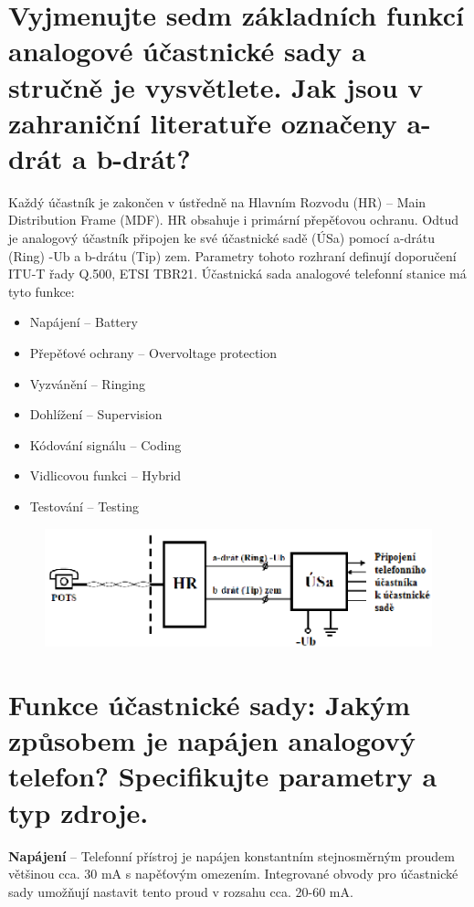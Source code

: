 \section{Vyjmenujte sedm základních funkcí analogové účastnické sady a stručně je vysvětlete. Jak jsou v zahraniční literatuře označeny a-drát a b-drát?}

Každý účastník je zakončen v ústředně na Hlavním Rozvodu (HR) -- Main Distribution Frame (MDF). HR obsahuje i primární přepěťovou ochranu. Odtud je analogový účastník připojen ke své účastnické sadě (ÚSa) pomocí a-drátu (Ring) -Ub a b-drátu (Tip) zem. Parametry tohoto rozhraní definují doporučení ITU-T řady Q.500, ETSI TBR21. Účastnická sada analogové telefonní stanice má tyto funkce:

\begin{itemize}[noitemsep]
    \item Napájení -- Battery
    \item Přepěťové ochrany -- Overvoltage protection
    \item Vyzvánění -- Ringing
    \item Dohlížení -- Supervision
    \item Kódování signálu -- Coding
    \item Vidlicovou funkci -- Hybrid
    \item Testování -- Testing
\end{itemize}

\begin{figure}[h!]
    \begin{center}
        \includegraphics[width=\textwidth]{images/otazka12.png}
        \label{img:6}
    \end{center}
\end{figure}

\section{Funkce účastnické sady: Jakým způsobem je napájen analogový telefon? Specifikujte parametry a typ zdroje.}

\textbf{Napájení} -- Telefonní přístroj je napájen konstantním stejnosměrným proudem většinou cca. 30 mA s napěťovým omezením. Integrované obvody pro účastnické sady umožňují nastavit tento proud v rozsahu cca. 20-60 mA.

